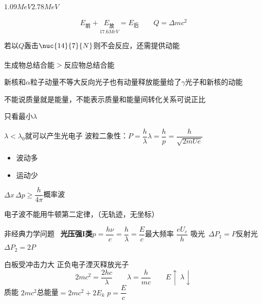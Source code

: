 
$1.09\unit{MeV}$\quad $2.78\unit{MeV}$ %

\[
E_{\text{前}}+\underset{17.6\unit{MeV}}{E_{\text{放}}}=E_{\text{后}}\qquad Q=\Delta mc^2
\]

若\unclear{$\alpha$}以$Q$轰击$\nuc{14}{7}{N}$则不会反应，还需提供动能 %

生成物总结合能$>$反应物总结合能\ \textsuperscript{}

新核和$\alpha$粒子动量不等大反向\quad 光子也有动量\quad 释放能量给了$\gamma$光子和新核的动能

不能说质量就是能量，不能表示质量和能量间转化关系\quad 可说正比

只看最小$\lambda$ %

$\lambda<\lambda_0$就可以产生光电子
波粒二象性：$P=\dfrac{h}{\lambda}$\qquad $\lambda=\dfrac{h}{p}=\dfrac{h}{\sqrt{2mUe}}$

\begin{itemize}
\item 波动\quad 多\quad {}
\item 运动\quad 少\quad {}
\end{itemize}

$\Delta x\,\Delta p\ge\dfrac{h}{4\pi}$\quad 概率波

电子波不能用牛顿第二定律，（无轨迹，无坐标）\  %

非经典力学问题\ 
\textbf{光压强I类}\quad $p=\dfrac{h\nu}{c}=\dfrac h\lambda=\dfrac Ec$\qquad 最大频率 $\dfrac{eU_c}{h}$
吸光\ $\Delta P_1=P$\qquad 反射光\ $\Delta P_2=2P$

白板受冲击力大
正负电子湮灭释放光子
\[
2mc^2=\frac{2hc}{\lambda}\qquad\lambda=\frac{h}{mc}\qquad E\uparrow\ \lambda\downarrow
\]
质能 $2mc^2$\qquad 总能量$=2mc^2+2E_k$
$p=\dfrac Ec$

